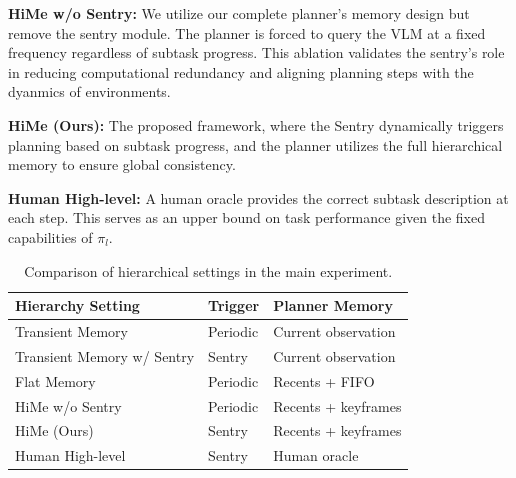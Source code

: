 \textbf{HiMe w/o Sentry:} 
    We utilize our complete planner's memory design but remove the sentry module. The planner is forced to query the VLM at a fixed frequency regardless of subtask progress. This ablation validates the sentry's role in reducing computational redundancy and aligning planning steps with the dyanmics of environments.
    
\textbf{HiMe (Ours):} 
    The proposed framework, where the Sentry dynamically triggers planning based on subtask progress, and the planner utilizes the full hierarchical memory to ensure global consistency.
    
\textbf{Human High-level:} 
    A human oracle provides the correct subtask description at each step. This serves as an upper bound on task performance given the fixed capabilities of $\pi_{l}$.


\newcommand{\TabW}{\dimexpr\columnwidth-6\tabcolsep\relax}

\begin{table}[t]
    \centering
    \small
    \setlength{\tabcolsep}{2.5pt}
    \renewcommand{\arraystretch}{1.12}
    \caption{
    Comparison of hierarchical settings in the main experiment. }
    \label{tab:main_settings}

    \begin{tabular}{@{}
    p{0.475\TabW}
    p{0.175\TabW}
    p{0.35\TabW}
    @{}}
        \toprule
        \textbf{Hierarchy Setting} & \textbf{Trigger} & \textbf{Planner Memory} \\
        \midrule
        Transient Memory
            & Periodic
            & Current observation \\
        Transient Memory w/ Sentry
            & Sentry
            & Current observation \\
        Flat Memory
            & Periodic
            & Recents + FIFO \\
        HiMe w/o Sentry
            & Periodic
            & Recents + keyframes \\
        HiMe (Ours)
            & Sentry
            & Recents + keyframes \\
        Human High-level
            & Sentry
            & Human oracle \\
        \bottomrule
    \end{tabular}
    \vspace{-0.6em}
\end{table}

